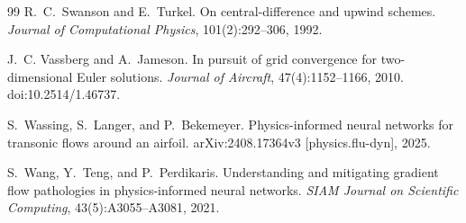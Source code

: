 \documentclass[11pt]{article}
\begin{document}
\begin{thebibliography}{99}
R.~C.~Swanson and E.~Turkel.
\newblock On central-difference and upwind schemes.
\newblock \emph{Journal of Computational Physics}, 101(2):292--306, 1992.

J.~C. Vassberg and A.~Jameson.
\newblock In pursuit of grid convergence for two-dimensional {Euler} solutions.
\newblock \emph{Journal of Aircraft}, 47(4):1152--1166, 2010.
\newblock doi:10.2514/1.46737.

S.~Wassing, S.~Langer, and P.~Bekemeyer.
\newblock Physics-informed neural networks for transonic flows around an airfoil.
\newblock arXiv:2408.17364v3 [physics.flu-dyn], 2025.

S.~Wang, Y.~Teng, and P.~Perdikaris.
\newblock Understanding and mitigating gradient flow pathologies in physics-informed neural
  networks.
\newblock \emph{SIAM Journal on Scientific Computing}, 43(5):A3055--A3081, 2021.

\end{thebibliography}
\end{document}

